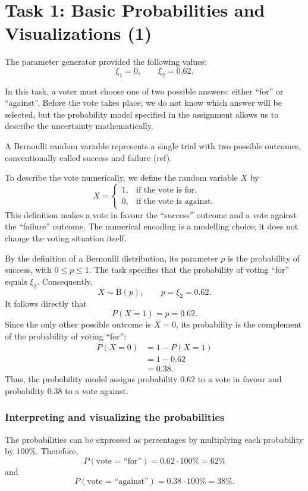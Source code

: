 \chapter*{Task 1: Basic Probabilities and Visualizations (1)}

The parameter generator provided the following values:
\[
\xi_1=0,\qquad \xi_2=0.62.
\]

In this task, a voter must choose one of two possible answers: either ``for'' or ``against''. Before the vote
takes place, we do not know which answer will be selected, but the
probability model specified in the assignment allows us to describe
the uncertainty mathematically.

A Bernoulli random variable represents a single trial with two possible
outcomes, conventionally called success and failure (ref).

To describe the vote numerically, we define the random variable $X$ by
\[
X=
\begin{cases}
1, & \text{if the vote is for},\\
0, & \text{if the vote is against}.
\end{cases}
\]
This definition makes a vote in favour the ``success'' outcome and a
vote against the ``failure'' outcome. The numerical encoding is a
modelling choice; it does not change the voting situation itself.

By the definition of a Bernoulli distribution, its parameter $p$
is the probability of success, with $0\leq p\leq 1$. The task
specifies that the probability of voting ``for'' equals $\xi_2$.
Consequently,
\[
X\sim\text{B}(p),
\qquad p=\xi_2=0.62.
\]
It follows directly that
\[
P(X=1)=p=0.62.
\]
Since the only other possible outcome is $X=0$, its probability is
the complement of the probability of voting ``for'':
\[
\begin{aligned}
P(X=0)
&=1-P(X=1)\\
&=1-0.62\\
&=0.38.
\end{aligned}
\]
Thus, the probability model assigns probability $0.62$ to a vote
in favour and probability $0.38$ to a vote against.

\subsection*{Interpreting and visualizing the probabilities}

The probabilities can be expressed as percentages by multiplying
each probability by $100\%$. Therefore,
\[
P(\text{vote = ``for''})=0.62\cdot100\%=62\%
\]
and
\[
P(\text{vote = ``against''})=0.38\cdot100\%=38\%.
\]

